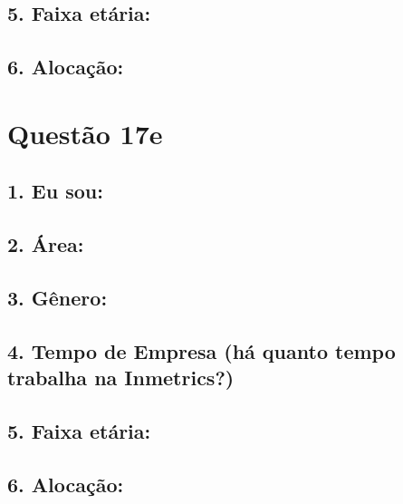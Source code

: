 \documentclass[]{book}
\begin{document}
\hypertarget{faixa-etaria-38}{%
\subsection{5. Faixa etária:}\label{faixa-etaria-38}}

\hypertarget{alocacao-38}{%
\subsection{6. Alocação:}\label{alocacao-38}}

\hypertarget{questao-17e}{%
\section{Questão 17e}\label{questao-17e}}

\hypertarget{eu-sou-39}{%
\subsection{1. Eu sou:}\label{eu-sou-39}}

\hypertarget{area-39}{%
\subsection{2. Área:}\label{area-39}}

\hypertarget{genero-39}{%
\subsection{3. Gênero:}\label{genero-39}}

\hypertarget{tempo-de-empresa-ha-quanto-tempo-trabalha-na-inmetrics-39}{%
\subsection{4. Tempo de Empresa (há quanto tempo trabalha na Inmetrics?)}\label{tempo-de-empresa-ha-quanto-tempo-trabalha-na-inmetrics-39}}

\hypertarget{faixa-etaria-39}{%
\subsection{5. Faixa etária:}\label{faixa-etaria-39}}

\hypertarget{alocacao-39}{%
\subsection{6. Alocação:}\label{alocacao-39}}
\end{document}
